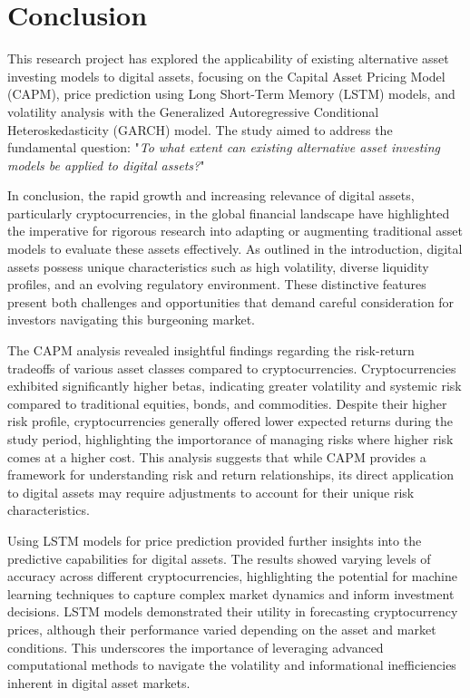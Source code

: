 \section{Conclusion}
This research project has explored the applicability of existing alternative asset investing models to digital assets, focusing on the Capital Asset Pricing Model (CAPM), price prediction using Long Short-Term Memory (LSTM) models, and volatility analysis with the Generalized Autoregressive Conditional Heteroskedasticity (GARCH) model. The study aimed to address the fundamental question: "\textit{To what extent can existing alternative asset investing models be applied to digital assets?}"

In conclusion, the rapid growth and increasing relevance of digital assets, particularly cryptocurrencies, in the global financial landscape have highlighted the imperative for rigorous research into adapting or augmenting traditional asset models to evaluate these assets effectively. As outlined in the introduction, digital assets possess unique characteristics such as high volatility, diverse liquidity profiles, and an evolving regulatory environment. These distinctive features present both challenges and opportunities that demand careful consideration for investors navigating this burgeoning market.

The CAPM analysis revealed insightful findings regarding the risk-return tradeoffs of various asset classes compared to cryptocurrencies. Cryptocurrencies exhibited significantly higher betas, indicating greater volatility and systemic risk compared to traditional equities, bonds, and commodities. Despite their higher risk profile, cryptocurrencies generally offered lower expected returns during the study period, highlighting the importorance of managing risks where higher risk comes at a higher cost. This analysis suggests that while CAPM provides a framework for understanding risk and return relationships, its direct application to digital assets may require adjustments to account for their unique risk characteristics.

Using LSTM models for price prediction provided further insights into the predictive capabilities for digital assets. The results showed varying levels of accuracy across different cryptocurrencies, highlighting the potential for machine learning techniques to capture complex market dynamics and inform investment decisions. LSTM models demonstrated their utility in forecasting cryptocurrency prices, although their performance varied depending on the asset and market conditions. This underscores the importance of leveraging advanced computational methods to navigate the volatility and informational inefficiencies inherent in digital asset markets.

